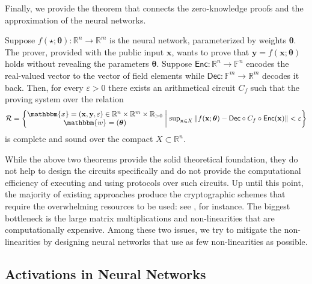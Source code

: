 \documentclass{iacrtrans}
\begin{document}
Finally, we provide the theorem that connects the zero-knowledge proofs and
the approximation of the neural networks.

\begin{theorem}
    Suppose $f(\star; \boldsymbol{\theta}): \mathbb{R}^n \to \mathbb{R}^m$ is
    the neural network, parameterized by weights $\boldsymbol{\theta}$. The
    prover, provided with the public input $\mathbf{x}$, wants to prove that
    $\mathbf{y} = f(\mathbf{x}; \boldsymbol{\theta})$ holds without revealing
    the parameters $\boldsymbol{\theta}$. Suppose $\mathsf{Enc}: \mathbb{R}^n
    \to \mathbb{F}^n$ encodes the real-valued vector to the vector of field
    elements while $\mathsf{Dec}: \mathbb{F}^m \to \mathbb{R}^m$ decodes it
    back. Then, for every $\varepsilon > 0$ there exists an arithmetical circuit
    $C_f$ such that the proving system over the relation
    \begin{equation*}
        \mathcal{R} = \left\{ \begin{matrix}
            \mathbbm{x} = (\mathbf{x}, \mathbf{y}, \varepsilon) \in \mathbb{R}^{n} \times \mathbb{R}^m \times \mathbb{R}_{> 0} \\
            \mathbbm{w} = (\boldsymbol{\theta})
        \end{matrix} \; \middle| \; \begin{matrix}
            \sup_{\mathbf{x} \in X}\left\|f(\mathbf{x}; \boldsymbol{\theta}) - \mathsf{Dec} \circ C_f \circ \mathsf{Enc}(\mathbf{x})\right\| < \varepsilon
        \end{matrix} \right\}
    \end{equation*}
    is complete and sound over the compact $X \subset \mathbb{R}^n$.
\end{theorem}

While the above two theorems provide the solid theoretical foundation, they do
not help to design the circuits specifically and do not provide the
computational efficiency of executing and using protocols over such circuits. Up
until this point, the majority of existing approaches produce the cryptographic
schemes that require the overwhelming resources to be used: see \cite{zkml}, for
instance. The biggest bottleneck is the large matrix multiplications and 
non-linearities that are computationally expensive. Among these two issues,
we try to mitigate the non-linearities by designing neural networks 
that use as few non-linearities as possible.

\subsection{Activations in Neural Networks}
\end{document}
